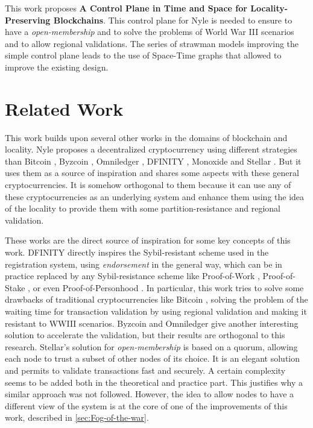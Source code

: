 \documentclass[a4paper,11pt,twoside=semi,openright]{report}
\begin{document}
This work proposes \textbf{A Control Plane in Time and Space for
Locality-Preserving Blockchains}. This control plane for Nyle is needed to
ensure to have a \textit{open-membership} and to solve the problems of World
War III scenarios and to allow regional validations. The series of strawman
models improving the simple control plane leads to the use of Space-Time graphs
that allowed to improve the existing design. 

\chapter{Related Work} \label{chap:RelatedWork} %

This work builds upon several other works in the domains of blockchain and
locality. Nyle proposes a decentralized cryptocurrency using different
strategies than Bitcoin \cite{Nakamoto2009}, Byzcoin \cite{Kogias2016},
Omniledger \cite{Kokoris-Kogias2017}, DFINITY \cite{Hanke2018}, Monoxide
\cite{Wang2019} and Stellar \cite{Lokhava2019}. But it uses them as a source of
inspiration and shares some aspects with these general cryptocurrencies. It is
somehow orthogonal to them because it can use any of these cryptocurrencies as
an underlying system and enhance them using the idea of the locality to provide
them with some partition-resistance and regional validation. 

These works are the direct source of inspiration for some key concepts of this
work. DFINITY \cite{ Hanke2018} directly inspires the Sybil-resistant scheme
used in the registration system, using \textit{endorsement} in the general way,
which can be in practice replaced by any Sybil-resistance scheme like
Proof-of-Work \cite{Nakamoto2009}, Proof-of-Stake \cite{wood2014ethereum}, or
even Proof-of-Personhood \cite{Borge2017}. In particular, this work tries to
solve some drawbacks of traditional cryptocurrencies like Bitcoin
\cite{Nakamoto2009}, solving the problem of the waiting time for transaction
validation by using regional validation and making it resistant to WWIII
scenarios. Byzcoin \cite{Kogias2016} and Omniledger \cite{Kokoris-Kogias2017}
give another interesting solution to accelerate the validation, but their
results are orthogonal to this research. Stellar's solution for
\textit{open-membership} \cite{Lokhava2019} is based on a quorum, allowing each
node to trust a subset of other nodes of its choice. It is an elegant solution
and permits to validate transactions fast and securely. A certain complexity
seems to be added both in the theoretical and practice part. This justifies why
a similar approach was not followed. However, the idea to allow nodes to have a
different view of the system is at the core of one of the improvements of this
work, described in \autoref{sec:Fog-of-the-war}.
\end{document}
